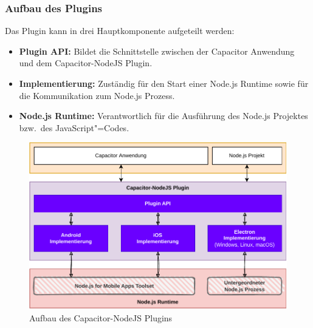 \subsubsection{Aufbau des Plugins}

Das Plugin kann in drei Hauptkomponente aufgeteilt werden:

\begin{itemize}
  \item \textbf{Plugin API:} Bildet die Schnittstelle zwischen der Capacitor Anwendung und dem Capacitor-NodeJS Plugin.
  \item \textbf{Implementierung:} Zuständig für den Start einer Node.js Runtime sowie für die Kommunikation zum Node.js Prozess.
  \item \textbf{Node.js Runtime:} Verantwortlich für die Ausführung des Node.js Projektes bzw.\ des JavaScript"=Codes.
\end{itemize}

\vfill

\begin{figure}[H]
  \centering
  \includegraphics[width=\textwidth]{assets/02_Capacitor-NodeJS/02_Aufbau.drawio.pdf}
  \caption[Capacitor-NodeJS / Aufbau]{Aufbau des Capacitor-NodeJS Plugins}
\end{figure}

\vfill
